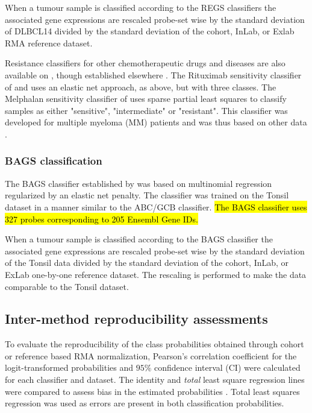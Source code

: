 \documentclass{article}
\begin{document}
When a tumour sample is classified according to the REGS classifiers the associated gene expressions are rescaled probe-set wise by the standard deviation of DLBCL14 divided by the standard deviation of the cohort, InLab, or Exlab RMA reference dataset.

Resistance classifiers for other chemotherapeutic drugs and diseases are also available on \hemaClass{}, though established elsewhere \citep{Boegsted2011,Bogsted2013,Laursen2014}.
The Rituximab sensitivity classifier of \citet{Laursen2014} and \citet{Laursen2015} uses an elastic net approach, as above, but with three classes.
The Melphalan sensitivity classifier of \citet{Boegsted2011} uses sparse partial least squares to classify samples as either "sensitive", "intermediate" or "resistant". This classifier was developed for multiple myeloma (MM) patients and was thus based on other data \citep{Boegsted2011}.


\subsubsection{BAGS classification}
The BAGS classifier established by \citet{DybkaerBoegsted2015} was based on multinomial regression regularized by an elastic net penalty.
The classifier was trained on the Tonsil dataset in a manner similar to the ABC/GCB classifier. \hl{The BAGS classifier uses 327 probes corresponding to 205 Ensembl Gene IDs.}

When a tumour sample is classified according to the BAGS classifier the associated gene expressions are rescaled probe-set wise by the standard deviation of the Tonsil data divided by the standard deviation of the cohort, InLab, or ExLab one-by-one reference dataset. The rescaling is performed to make the data comparable to the Tonsil dataset.


\subsection{Inter-method reproducibility assessments}
To evaluate the reproducibility of the class probabilities obtained through cohort or reference based RMA normalization, Pearson's correlation coefficient for the logit-transformed probabilities and $95\%$ confidence interval (CI) were calculated for each classifier and dataset.
The identity and \emph{total} least square regression lines were compared to assess bias in the estimated probabilities \citep{CHEN1989}.
Total least squares regression was used as errors are present in both classification probabilities.
\end{document}
